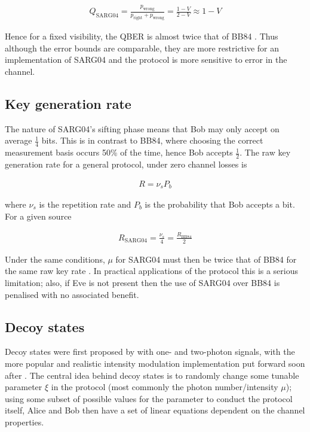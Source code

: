 \documentclass[paper=a4, fontsize=11pt]{scrartcl} %
\numberwithin{equation}{section} %
\numberwithin{figure}{section} %
\numberwithin{table}{section} %
\begin{document}
\begin{align}
	Q_{\mathrm{SARG04}} =
	\frac{p_{\mathrm{wrong}}}{p_{\mathrm{right}} + p_{\mathrm{wrong}}}
	= \frac{1-V}{2-V}
	\approx 1-V
\end{align}

Hence for a fixed visibility, the QBER is almost twice that of BB84 \citep{branciardSARG04}. Thus although the error bounds
are comparable, they are more restrictive for an implementation of SARG04 and the protocol is more sensitive to error in the channel.

\subsection{Key generation rate}
The nature of SARG04's sifting phase means that Bob may only accept on average $\frac{1}{4}$ bits. This is in contrast to BB84, where
choosing the correct measurement basis occurs 50\% of the time, hence Bob accepts $\frac{1}{2}$. The raw key generation rate for a general protocol,
under zero channel losses is

\begin{align}
R = \nu_s P_b
\end{align}

where $\nu_s$ is the repetition rate and $P_b$ is the probability that Bob accepts a bit. For a given source

\begin{align}
	R_{\mathrm{SARG04}} = \frac{\nu_s}{4} = \frac{R_{\mathrm{BB84}}}{2}
\end{align}

Under the same conditions, $\mu$ for SARG04 must then be twice that of BB84 for the same raw key rate \citep{perf2protocols, SARG04orig}.
In practical applications of the protocol this is a serious limitation; also, if Eve is not present then the use of SARG04 over BB84 is penalised
with no associated benefit.

\subsection{Decoy states}
Decoy states were first proposed by \citet{decoyOrig} with one- and two-photon signals, with the more popular and realistic
intensity modulation implementation put forward soon after \citep{lo2005}. The central idea behind decoy states is to randomly
change some tunable parameter $\xi$ in the protocol (most commonly the photon number/intensity $\mu$); using some subset
of possible values for the parameter to conduct the protocol itself, Alice and Bob then have a set of linear equations dependent
on the channel properties.
\end{document}
